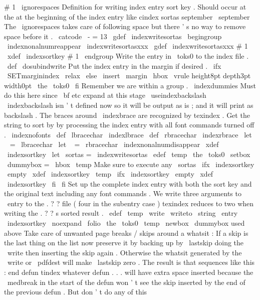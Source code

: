 {{{{#
1
{
\
ignorespaces
}
%
%
Definition
for
writing
index
entry
sort
key
.
Should
occur
at
the
at
%
the
beginning
of
the
index
entry
like
%
cindex
sortas
{
september
}
\
september
%
The
\
ignorespaces
takes
care
of
following
space
but
there
'
s
no
way
%
to
remove
space
before
it
.
{
\
catcode
\
-
=
13
\
gdef
\
indexwritesortas
{
%
\
begingroup
\
indexnonalnumreappear
\
indexwritesortasxxx
}
\
gdef
\
indexwritesortasxxx
#
1
{
%
\
xdef
\
indexsortkey
{
#
1
}
\
endgroup
}
}
%
Write
the
entry
in
\
toks0
to
the
index
file
.
%
\
def
\
dosubindwrite
{
%
%
Put
the
index
entry
in
the
margin
if
desired
.
\
ifx
\
SETmarginindex
\
relax
\
else
\
insert
\
margin
{
\
hbox
{
\
vrule
height8pt
depth3pt
width0pt
\
the
\
toks0
}
}
%
\
fi
%
%
Remember
we
are
within
a
group
.
\
indexdummies
%
Must
do
this
here
since
\
bf
etc
expand
at
this
stage
\
useindexbackslash
%
\
indexbackslash
isn
'
t
defined
now
so
it
will
be
output
%
as
is
;
and
it
will
print
as
backslash
.
%
The
braces
around
\
indexbrace
are
recognized
by
texindex
.
%
%
Get
the
string
to
sort
by
by
processing
the
index
entry
with
all
%
font
commands
turned
off
.
{
\
indexnofonts
\
def
\
lbracechar
{
{
\
indexlbrace
}
}
%
\
def
\
rbracechar
{
{
\
indexrbrace
}
}
%
\
let
\
{
=
\
lbracechar
\
let
\
}
=
\
rbracechar
\
indexnonalnumdisappear
\
xdef
\
indexsortkey
{
}
%
\
let
\
sortas
=
\
indexwritesortas
\
edef
\
temp
{
\
the
\
toks0
}
%
\
setbox
\
dummybox
=
\
hbox
{
\
temp
}
%
Make
sure
to
execute
any
\
sortas
\
ifx
\
indexsortkey
\
empty
\
xdef
\
indexsortkey
{
\
temp
}
%
\
ifx
\
indexsortkey
\
empty
\
xdef
\
indexsortkey
{
}
\
fi
\
fi
}
%
%
%
Set
up
the
complete
index
entry
with
both
the
sort
key
and
%
the
original
text
including
any
font
commands
.
We
write
%
three
arguments
to
\
entry
to
the
.
?
?
file
(
four
in
the
%
subentry
case
)
texindex
reduces
to
two
when
writing
the
.
?
?
s
%
sorted
result
.
\
edef
\
temp
{
%
\
write
\
writeto
{
%
\
string
\
entry
{
\
indexsortkey
}
{
\
noexpand
\
folio
}
{
\
the
\
toks0
}
}
%
}
%
\
temp
}
\
newbox
\
dummybox
%
used
above
%
Take
care
of
unwanted
page
breaks
/
skips
around
a
whatsit
:
%
%
If
a
skip
is
the
last
thing
on
the
list
now
preserve
it
%
by
backing
up
by
\
lastskip
doing
the
\
write
then
inserting
%
the
skip
again
.
Otherwise
the
whatsit
generated
by
the
%
\
write
or
\
pdfdest
will
make
\
lastskip
zero
.
The
result
is
that
%
sequences
like
this
:
%
end
defun
%
tindex
whatever
%
defun
.
.
.
%
will
have
extra
space
inserted
because
the
\
medbreak
in
the
%
start
of
the
defun
won
'
t
see
the
skip
inserted
by
the
end
of
%
the
previous
defun
.
%
%
But
don
'
t
do
any
of
this
}}}}
